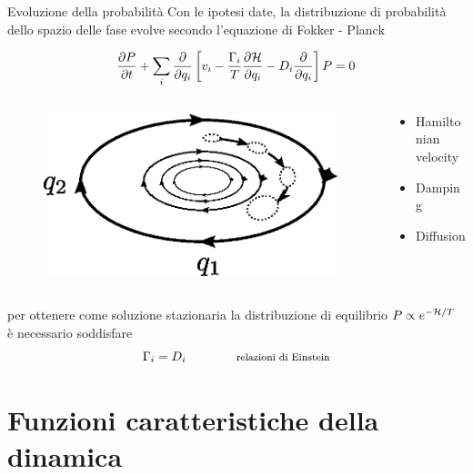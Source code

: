 \documentclass[10pt]{beamer}
\begin{document}
\begin{frame}{Evoluzione della probabilità}
  Con le ipotesi date, la distribuzione di probabilità dello spazio delle fase evolve secondo l'equazione di Fokker - Planck
  
  \begin{equation*}
   \frac{\partial P}{\partial t} + \sum_i \frac{\partial}{\partial q_i} \left[ v_i - \frac{\Gamma_i}{T} \frac{\partial \mathcal{H}}{\partial q_i} - D_i \frac{\partial}{\partial q_i} \right] P = 0
  \end{equation*}
\begin{columns}
 \begin{column}{.5\textwidth}
  \begin{figure}
       \includegraphics[width=.8\columnwidth]{pics/Oscillator_phase_portrait.eps}
      \end{figure}
  \end{column}
  \hfill
  \begin{column}{.4\textwidth}
   \begin{itemize}
    \item Hamiltonian velocity
    \item Damping
    \item Diffusion
   \end{itemize}
  \end{column}
\end{columns}

\vskip10pt
 per ottenere come soluzione stazionaria la distribuzione di equilibrio $P \propto e^{-\mathcal{H}/T}$ è necessario soddisfare
 \begin{equation*}
  \Gamma_i = D_i \qquad \qquad \text{\footnotesize relazioni di Einstein}
 \end{equation*}

      
\end{frame}



\section{Funzioni caratteristiche della dinamica}
\end{document}
